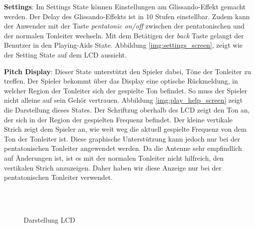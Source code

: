 \textbf{Settings}:
Im Settings State können Einstellungen am Glissando-Effekt gemacht werden. Der Delay des Glissando-Effekts ist in 10 Stufen einstellbar. Zudem kann der Anwender mit der Taste \textit{pentatonic on/off} zwischen der pentatonischen und der normalen Tonleiter wechseln. Mit dem Betätigen der \textit{back} Taste gelangt der Benutzer in den Playing-Aids State. Abbildung \ref{img:settings_screen}, zeigt wie der Setting State auf dem LCD aussieht.

\textbf{Pitch Display}:
Dieser State unterstützt den Spieler dabei, Töne der Tonleiter zu treffen. Der Spieler bekommt über das Display eine optische Rückmeldung, in welcher Region der Tonleiter sich der gespielte Ton befindet. So muss der Spieler nicht alleine auf sein Gehör vertrauen.
Abbildung \ref{img:play_help_screen} zeigt die Darstellung dieses States.  
Der Schriftzug oberhalb des LCD zeigt den Ton an, der sich in der Region der gespielten Frequenz befindet. 
Der kleine vertikale Strich zeigt dem Spieler an, wie weit weg die aktuell gespielte Frequenz von dem Ton der Tonleiter ist. 
Diese graphische Unterstützung kann jedoch nur bei der pentatonischen Tonleiter angewendet werden. Da die Antenne sehr empfindlich auf Änderungen ist, ist es mit der normalen Tonleiter nicht hilfreich, den vertikalen Strich anzuzeigen. Daher haben wir diese Anzeige nur bei der pentatonischen Tonleiter verwendet.

\begin{figure}[!ht]
	\hfill
	\hfill
	\\
	\hfill
	\hfill
	\\
	\hfill
	\hfill
	\hfill

	\caption{Darstellung LCD}
	\label{fig:dummy}
\end{figure}
